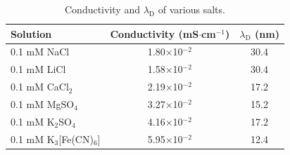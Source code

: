 \documentclass[manuscript=suppinfo,email=true, hyperref=true, keywords=false]{achemso}
\begin{document}
\begin{table}[htbp]
  \centering
  \begin{tabular}{lcc}
    \hline
    Solution & Conductivity (mS$\cdot$cm$^{-1}$) & $\lambda_{\mathrm{D}}$ (nm) \\
    \hline
    0.1 mM NaCl &1.80$\times$10$^{-2}$  &30.4\\
    0.1 mM LiCl &1.58$\times$10$^{-2}$ &30.4\\
    0.1 mM CaCl$_{2}$&  2.19$\times$10$^{-2}$ &17.2\\
    0.1 mM MgSO$_{4}$   &3.27$\times$10$^{-2}$ &15.2\\
    0.1 mM K$_{2}$SO$_{4}$      &4.16$\times$10$^{-2}$ &17.2\\
    0.1 mM K$_{3}$[Fe(CN)$_{6}$]&       5.95$\times$10$^{-2}$  &12.4\\
    \hline
  \end{tabular}
  \caption{Conductivity and $\lambda_{\mathrm{D}}$ of various salts.}
  \label{tab:conductivity}
\end{table}


\section*{}
\label{sec:ref}

\end{document}

